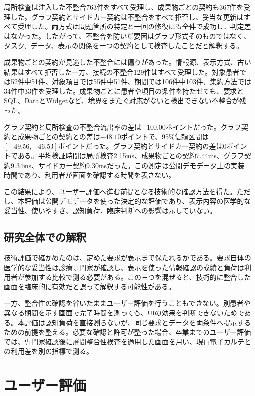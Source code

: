 \documentclass[a4paper]{jsarticle}
\begin{document}
局所検査は注入した不整合763件をすべて受理し、成果物ごとの契約も367件を受理した。グラフ契約とサイドカー契約は不整合をすべて拒否し、妥当な更新はすべて受理した。両方式は問題箇所の特定と一回の修復にも全件で成功し、判定差はなかった。したがって、不整合を防いだ要因はグラフ形式そのものではなく、タスク、データ、表示の関係を一つの契約として検査したことだと解釈する。

成果物ごとの契約が見逃した不整合には偏りがあった。情報源、表示方式、古い結果はすべて拒否した一方、接続の不整合129件はすべて受理した。対象患者では52件中51件、対象項目では55件中51件、期間では106件中103件、集約方法では34件中33件を受理した。成果物ごとに患者や項目の条件を持たせても、要求とSQL、DataとWidgetなど、境界をまたぐ対応がないと検出できない不整合が残った。

グラフ契約と局所検査の不整合流出率の差は$-100.00$ポイントだった。グラフ契約と成果物ごとの契約との差は$-48.10$ポイントで、95\%信頼区間は$[-49.56,-46.53]$ポイントだった。グラフ契約とサイドカー契約の差は0ポイントである。平均検証時間は局所検査2.15ms、成果物ごとの契約7.44ms、グラフ契約9.34ms、サイドカー契約9.30msだった。この測定は公開デモデータ上の実装時間であり、利用者が画面を確認する時間を表さない。

この結果により、ユーザー評価へ進む前提となる技術的な確認方法を得た。ただし、本評価は公開デモデータを使った決定的な評価であり、表示内容の医学的な妥当性、使いやすさ、認知負荷、臨床判断への影響は示していない。

\subsection{研究全体での解釈}

技術評価で確かめたのは、定めた要求が表示まで保たれるかである。要求自体の医学的な妥当性は診療専門家が確認し、表示を使った情報確認の成績と負荷は利用者が参加する比較で測る必要がある。この三つを混ぜると、技術的に整合した画面を臨床的に有効だと誤って解釈する可能性がある。

一方、整合性の確認を省いたままユーザー評価を行うこともできない。別患者や異なる期間を示す画面で完了時間を測っても、UIの効果を判断できないためである。本評価は認知負荷を直接測らないが、同じ要求とデータを両条件へ提示するための前提を整える。必要な確認と許可が整った場合、卒業までのユーザー評価では、専門家確認後に層間整合性検査を適用した画面を用い、現行電子カルテとの利用差を別の指標で測る。

\section{ユーザー評価}
\end{document}
